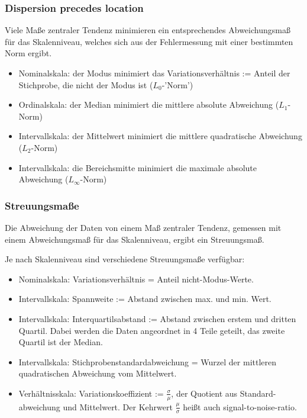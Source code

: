 \begin{frame}
  \frametitle{Dispersion precedes location}
  Viele Maße zentraler Tendenz minimieren ein entsprechendes Abweichungsmaß für das Skalenniveau, welches sich aus der Fehlermessung mit einer bestimmten Norm ergibt.
  
  \begin{itemize}[<+->]
  \item Nominalskala: der Modus minimiert das \alert{Variationsverhältnis} := Anteil der Stichprobe, die nicht der Modus ist ($L_0$-'Norm')
  \item Ordinalskala: der Median minimiert die mittlere absolute Abweichung ($L_1$-Norm)
  \item Intervallskala: der Mittelwert minimiert die mittlere quadratische Abweichung ($L_2$-Norm)
  \item Intervallskala: die Bereichsmitte minimiert die maximale absolute Abweichung ($L_\infty$-Norm)
  \end{itemize}
  
\end{frame}

\begin{frame}
  \frametitle{Streuungsmaße}
  Die Abweichung der Daten von einem Maß zentraler Tendenz, gemessen mit einem Abweichungsmaß für das Skalenniveau, ergibt ein Streuungsmaß.
  
  Je nach Skalenniveau sind verschiedene Streuungsmaße verfügbar:
  \begin{itemize}[<+->]
  \item Nominalskala: Variationsverhältnis = Anteil nicht-Modus-Werte.
  \item Intervallskala: \alert{Spannweite} := Abstand zwischen max. und min. Wert.
  \item Intervallskala: \alert{Interquartilsabstand} := Abstand zwischen erstem und dritten Quartil.
    Dabei werden die Daten angeordnet in 4 Teile geteilt, das zweite Quartil ist der Median.
  \item Intervallskala: Stichprobenstandardabweichung = Wurzel der mittleren quadratischen Abweichung vom Mittelwert.
  \item Verhältnisskala: \alert{Variationskoeffizient} := $\frac{\sigma}{\mu}$, der Quotient aus Standard- abweichung und Mittelwert. Der Kehrwert $\frac{\mu}{\sigma}$ heißt auch \alert{signal-to-noise-ratio}.
  \end{itemize}
  
\end{frame}


